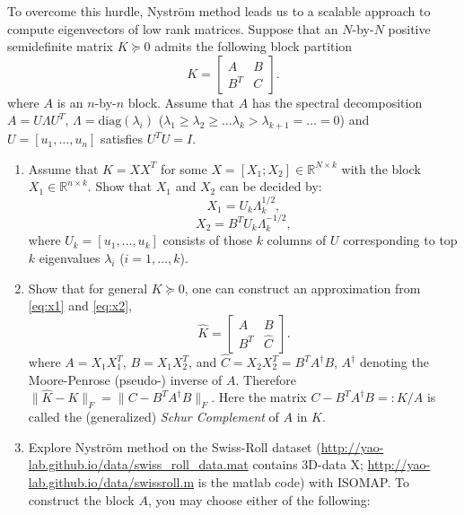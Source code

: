 \documentclass[11pt]{article}
\def\R{{\mathbb R}}
\def\diag{{\mathrm{diag}}}
\begin{document}
\begin{enumerate}
To overcome this hurdle, Nystr\"{o}m method leads us to a scalable approach to compute eigenvectors of low rank matrices.  
Suppose that an $N$-by-$N$ positive semidefinite matrix $K\succeq 0$ admits the following block partition
\begin{equation}
K = \left[
\begin{array}{cc}
A & B \\
B^T & C
\end{array}
\right].
\end{equation}
where $A$ is an $n$-by-$n$ block. Assume that $A$ has the spectral decomposition $A=U \Lambda U^T$, $\Lambda=\diag(\lambda_i)$ ($\lambda_1\geq \lambda_2 \geq \ldots \lambda_k > \lambda_{k+1}=\ldots=0$) and $U=[u_1,\ldots,u_n]$ satisfies $U^TU=I$. 
\begin{enumerate}
\item Assume that $K=X X^T$ for some $X=[X_1; X_2] \in \R^{N\times k}$ with the block $X_1\in \R^{n\times k}$. Show that $X_1$ and $X_2$ can be decided by:
\begin{equation}\label{eq:x1}
 X_1 = U_k \Lambda_k^{1/2}, 
\end{equation}
\begin{equation} \label{eq:x2}
X_2 = B^T U_k \Lambda_k^{-1/2}, 
\end{equation}
where $U_k=[u_1, \ldots, u_k]$ consists of those $k$ columns of $U$ corresponding to top $k$ eigenvalues $\lambda_i$ ($i=1,\ldots,k$).  
\item Show that for general $K\succeq 0$, one can construct an approximation from \eqref{eq:x1} and \eqref{eq:x2}, 
\begin{equation}
\hat{K} = \left[
\begin{array}{cc}
A & B \\
B^T & \hat{C} 
\end{array}
\right].
\end{equation}
where $A=X_1 X_1^T$, $B= X_1 X_2^T$, and $\hat{C}=X_2 X_2^T =   B^T A^\dagger B$, $A^\dagger$ denoting the Moore-Penrose (pseudo-) inverse of $A$. Therefore $\|\hat{K}-K\|_F =\|C- B^T A^\dagger B\|_F$. Here the matrix $C-B^T A^\dagger B=:K/A$ is called the (generalized) \emph{Schur Complement} of $A$ in $K$.
\item Explore Nystr\"{o}m method on the Swiss-Roll dataset (\url{http://yao-lab.github.io/data/swiss_roll_data.mat} contains 3D-data X; \url{http://yao-lab.github.io/data/swissroll.m} is the matlab code) with ISOMAP. To construct the block $A$, you may choose either of the following: 

\end{enumerate}
\end{enumerate}
\end{document}
